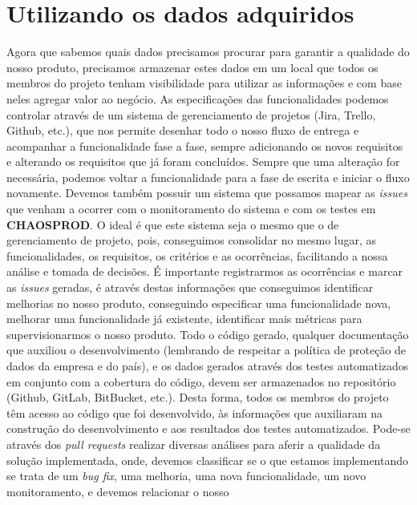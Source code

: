     \section{Utilizando os dados adquiridos}
      Agora que sabemos quais dados precisamos procurar para garantir a qualidade
      do nosso produto, precisamos armazenar estes dados em um local que todos os
      membros do projeto tenham visibilidade para utilizar as informações e com
      base neles agregar valor ao negócio. As especificações das funcionalidades
      podemos controlar através de um sistema de gerenciamento de projetos (Jira,
      Trello, Github, etc.), que nos permite desenhar todo o nosso fluxo de entrega e
      acompanhar a funcionalidade fase a fase, sempre adicionando os novos requisitos
      e alterando os requisitos que já foram concluídos. Sempre que uma alteração
      for necessária, podemos voltar a funcionalidade para a fase de escrita e
      iniciar o fluxo novamente. Devemos também possuir um sistema que possamos
      mapear as \textit{issues} que venham a ocorrer com o monitoramento do sistema
      e com os testes em \textbf{CHAOSPROD}. O ideal é que este sistema seja o
      mesmo que o de gerenciamento de projeto, pois, conseguimos consolidar no
      mesmo lugar, as funcionalidades, os requisitos, os critérios e as
      ocorrências, facilitando a nossa análise e tomada de decisões. É importante
      registrarmos as ocorrências e marcar as \textit{issues} geradas, é
      através destas informações que conseguimos identificar melhorias no nosso
      produto, conseguindo especificar uma funcionalidade nova, melhorar uma
      funcionalidade já existente, identificar mais métricas para supervisionarmos
      o nosso produto. \newline
      Todo o código gerado, qualquer documentação que auxiliou o desenvolvimento
      (lembrando de respeitar a política de proteção de dados da empresa e do
      país), e os dados gerados através dos testes automatizados em conjunto
      com a cobertura do código, devem ser armazenados no repositório (Github,
      GitLab, BitBucket, etc.). Desta forma, todos os membros do projeto têm
      acesso ao código que foi desenvolvido, às informações que auxiliaram na
      construção do desenvolvimento e aos resultados dos testes automatizados.
      Pode-se através dos \textit{pull requests} realizar diversas análises para
      aferir a qualidade da solução implementada, onde, devemos classificar se o
      que estamos implementando se trata de um \textit{bug fix}, uma melhoria,
      uma nova funcionalidade, um novo monitoramento, e devemos relacionar o nosso
